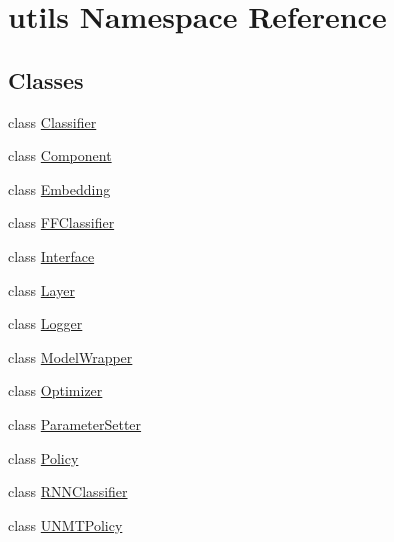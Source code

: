 \hypertarget{namespaceutils}{}\section{utils Namespace Reference}
\label{namespaceutils}
\subsection*{Classes}
\begin{DoxyCompactItemize}
\item 
class \hyperlink{classutils_1_1Classifier}{Classifier}
\item 
class \hyperlink{classutils_1_1Component}{Component}
\item 
class \hyperlink{classutils_1_1Embedding}{Embedding}
\item 
class \hyperlink{classutils_1_1FFClassifier}{F\+F\+Classifier}
\item 
class \hyperlink{classutils_1_1Interface}{Interface}
\item 
class \hyperlink{classutils_1_1Layer}{Layer}
\item 
class \hyperlink{classutils_1_1Logger}{Logger}
\item 
class \hyperlink{classutils_1_1ModelWrapper}{Model\+Wrapper}
\item 
class \hyperlink{classutils_1_1Optimizer}{Optimizer}
\item 
class \hyperlink{classutils_1_1ParameterSetter}{Parameter\+Setter}
\item 
class \hyperlink{classutils_1_1Policy}{Policy}
\item 
class \hyperlink{classutils_1_1RNNClassifier}{R\+N\+N\+Classifier}
\item 
class \hyperlink{classutils_1_1UNMTPolicy}{U\+N\+M\+T\+Policy}
\end{DoxyCompactItemize}
